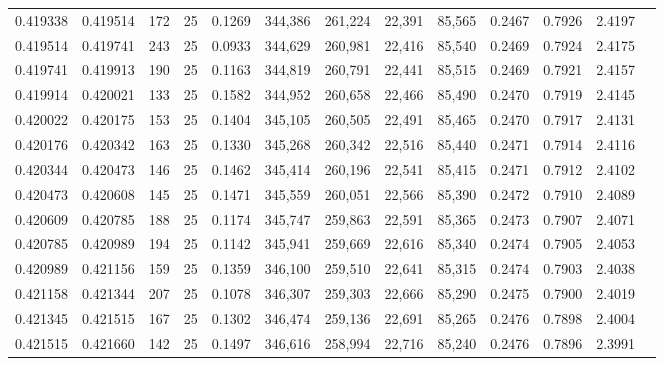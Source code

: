 \begin{tabular}{rrrrrrrrrrrrr}
0.419338 & 0.419514 &   172 &  25 &                                     0.1269 & 344,386 & 261,224 &  22,391 &  85,565 & 0.2467 & 0.7926 & 2.4197 \\
0.419514 & 0.419741 &   243 &  25 &                                     0.0933 & 344,629 & 260,981 &  22,416 &  85,540 & 0.2469 & 0.7924 & 2.4175 \\
0.419741 & 0.419913 &   190 &  25 &                                     0.1163 & 344,819 & 260,791 &  22,441 &  85,515 & 0.2469 & 0.7921 & 2.4157 \\
0.419914 & 0.420021 &   133 &  25 &                                     0.1582 & 344,952 & 260,658 &  22,466 &  85,490 & 0.2470 & 0.7919 & 2.4145 \\
0.420022 & 0.420175 &   153 &  25 &                                     0.1404 & 345,105 & 260,505 &  22,491 &  85,465 & 0.2470 & 0.7917 & 2.4131 \\
0.420176 & 0.420342 &   163 &  25 &                                     0.1330 & 345,268 & 260,342 &  22,516 &  85,440 & 0.2471 & 0.7914 & 2.4116 \\
0.420344 & 0.420473 &   146 &  25 &                                     0.1462 & 345,414 & 260,196 &  22,541 &  85,415 & 0.2471 & 0.7912 & 2.4102 \\
0.420473 & 0.420608 &   145 &  25 &                                     0.1471 & 345,559 & 260,051 &  22,566 &  85,390 & 0.2472 & 0.7910 & 2.4089 \\
0.420609 & 0.420785 &   188 &  25 &                                     0.1174 & 345,747 & 259,863 &  22,591 &  85,365 & 0.2473 & 0.7907 & 2.4071 \\
0.420785 & 0.420989 &   194 &  25 &                                     0.1142 & 345,941 & 259,669 &  22,616 &  85,340 & 0.2474 & 0.7905 & 2.4053 \\
0.420989 & 0.421156 &   159 &  25 &                                     0.1359 & 346,100 & 259,510 &  22,641 &  85,315 & 0.2474 & 0.7903 & 2.4038 \\
0.421158 & 0.421344 &   207 &  25 &                                     0.1078 & 346,307 & 259,303 &  22,666 &  85,290 & 0.2475 & 0.7900 & 2.4019 \\
0.421345 & 0.421515 &   167 &  25 &                                     0.1302 & 346,474 & 259,136 &  22,691 &  85,265 & 0.2476 & 0.7898 & 2.4004 \\
0.421515 & 0.421660 &   142 &  25 &                                     0.1497 & 346,616 & 258,994 &  22,716 &  85,240 & 0.2476 & 0.7896 & 2.3991 \\

\end{tabular}
